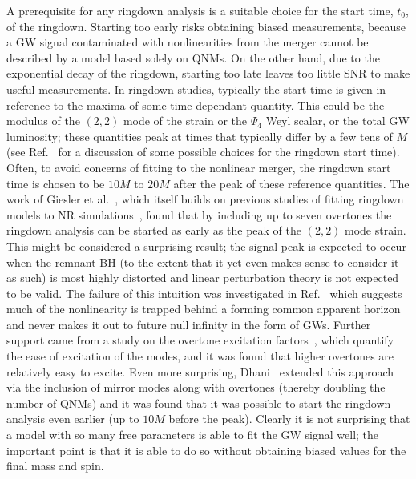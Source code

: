 A prerequisite for any ringdown analysis is a suitable choice for the start time, $t_0$, of the ringdown. 
Starting too early risks obtaining biased measurements, because a GW signal contaminated with nonlinearities from the merger cannot be described by a model based solely on QNMs.
On the other hand, due to the exponential decay of the ringdown, starting too late leaves too little SNR to make useful measurements. 
In ringdown studies, typically the start time is given in reference to the maxima of some time-dependant quantity.
This could be the modulus of the $(2,2)$ mode of the strain or the $\Psi_4$ Weyl scalar, or the total GW luminosity; these quantities peak at times that typically differ by a few tens of $M$ (see Ref.~\cite{Berti:2007fi} for a discussion of some possible choices for the ringdown start time).
Often, to avoid concerns of fitting to the nonlinear merger, the ringdown start time is chosen to be $10M$ to $20M$ after the peak of these reference quantities. 
The work of Giesler et al.~\cite{Giesler:2019uxc}, which itself builds on previous studies of fitting ringdown models to NR simulations~\cite{Dorband:2006gg, Buonanno:2006ui, Berti:2007fi, Kamaretsos:2011um, Kamaretsos:2012bs, London:2014cma, Baibhav:2017jhs}, found that by including up to seven overtones the ringdown analysis can be started as early as the peak of the $(2,2)$ mode strain. 
This might be considered a surprising result; the signal peak is expected to occur when the remnant BH (to the extent that it yet even makes sense to consider it as such) is most highly distorted and linear perturbation theory is not expected to be valid. 
The failure of this intuition was investigated in Ref.~\cite{Okounkova:2020vwu} which suggests much of the nonlinearity is trapped behind a forming common apparent horizon and never makes it out to future null infinity in the form of GWs. 
Further support came from a study on the overtone excitation factors~\cite{Oshita:2021iyn}, which quantify the ease of excitation of the modes, and it was found that higher overtones are relatively easy to excite.
Even more surprising, Dhani~\cite{Dhani:2020nik} extended this approach via the inclusion of mirror modes along with overtones (thereby doubling the number of QNMs) and it was found that it was possible to start the ringdown analysis even earlier (up to $10M$ before the peak). 
Clearly it is not surprising that a model with so many free parameters is able to fit the GW signal well; the important point is that it is able to do so without obtaining biased values for the final mass and spin. 

